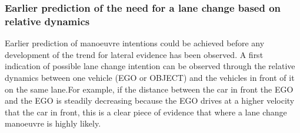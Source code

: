 
\subsubsection{Earlier prediction of the need for a lane change based on relative dynamics}



Earlier prediction of manoeuvre intentions could be achieved before any development of the trend for lateral evidence has been observed. A first indication of possible lane change intention can be observed through the relative dynamics between one vehicle (EGO or OBJECT) and the vehicles in front of it on the same lane.For example, if the distance between the car in front the EGO and the EGO is steadily decreasing because the EGO drives at a higher velocity that the car in front, this is a clear piece of evidence that  where a lane change manoeuvre is highly likely. 

